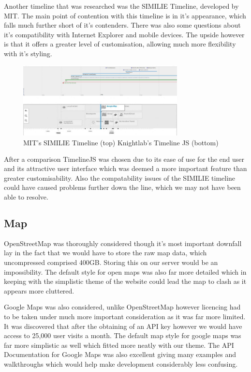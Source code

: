 \documentclass{l3proj}
\begin{document}
Another timeline that was researched was the SIMILIE Timeline, developed by MIT. The main point of contention with this timeline is in it’s appearance, which falls much further short of it’s contenders. There was also some questions about it’s compatibility with Internet Explorer and mobile devices. The upside however is that it offers a greater level of customisation, allowing much more flexibility with it’s styling. 

\begin{figure}[ht!]
  \centering
\includegraphics[width=0.75\textwidth]{images/similie_knightlab_timeline.jpg}
\caption{MIT's SIMILIE Timeline (top) Knightlab's Timeline JS (bottom)}
\end{figure}

After a comparison TimelineJS was chosen due to its ease of use for the end user and its attractive user interface which was deemed a more important feature than greater customisability. Also the compatability issues of the SIMILIE timeline could have caused problems further down the line, which we may not have been able to resolve.
 

\subsection{Map}

OpenStreetMap was thoroughly considered though it’s most important downfall lay in the fact that we would have to store the raw map data, which uncompressed comprised 400GB. Storing this on our server would be an impossibility. The default style for open maps was also far more detailed which in keeping with the simplistic theme of the website could lead the map to clash as it appears more cluttered.

Google Maps was also considered, unlike OpenStreetMap however licencing had to be taken under much more important consideration as it was far more limited. It was discovered that after the obtaining of an API key however we would have access to 25,000 user visits a month. The default map style for google maps was far more simplistic as well which fitted more neatly with our theme. The API Documentation for Google Maps was also excellent giving many examples and walkthroughs which would help make development considerably less confusing.
\end{document}
